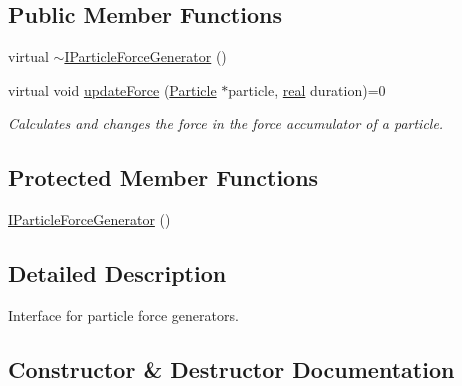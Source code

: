 \subsection*{Public Member Functions}
\begin{DoxyCompactItemize}
\item 
virtual \mbox{\hyperlink{classr3_1_1_i_particle_force_generator_a1682bcec51cd294cbef8b6cbd4f50266}{$\sim$\+I\+Particle\+Force\+Generator}} ()
\item 
virtual void \mbox{\hyperlink{classr3_1_1_i_particle_force_generator_a8b692fc3a40f815dc44c106b451c3a90}{update\+Force}} (\mbox{\hyperlink{classr3_1_1_particle}{Particle}} $\ast$particle, \mbox{\hyperlink{namespacer3_ab2016b3e3f743fb735afce242f0dc1eb}{real}} duration)=0
\begin{DoxyCompactList}\small\item\em Calculates and changes the force in the force accumulator of a particle. \end{DoxyCompactList}\end{DoxyCompactItemize}
\subsection*{Protected Member Functions}
\begin{DoxyCompactItemize}
\item 
\mbox{\hyperlink{classr3_1_1_i_particle_force_generator_a919ae235883c736232741d947fd9a708}{I\+Particle\+Force\+Generator}} ()
\end{DoxyCompactItemize}


\subsection{Detailed Description}
Interface for particle force generators. 

\subsection{Constructor \& Destructor Documentation}
\mbox{\label{classr3_1_1_i_particle_force_generator_a1682bcec51cd294cbef8b6cbd4f50266}} 
